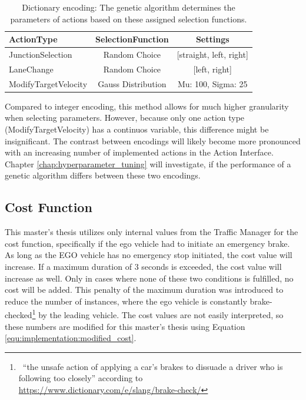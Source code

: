 \begin{table}[ht]
	\centering
	\begin{tabular}{lcc}
		\hline
		ActionType & SelectionFunction & Settings \\
		\hline
		JunctionSelection 	& Random Choice & [straight, left, right] \\
		LaneChange 			& Random Choice & [left, right]\\
		ModifyTargetVelocity & Gauss Distribution & Mu: 100, Sigma: 25\\
		\hline
	\end{tabular}
	\caption{Dictionary encoding: The genetic algorithm determines the parameters of actions based on these assigned selection functions.}
	\label{tab:implementation:dict_encoding_probabilities}
\end{table}

Compared to integer encoding, this method allows for much higher granularity when selecting parameters. However, because only one action type (ModifyTargetVelocity) has a continuos variable, this difference might be insignificant. The contrast between encodings will likely become more pronounced with an increasing number of implemented actions in the Action Interface. Chapter \ref{chap:hyperparameter_tuning} will investigate, if the performance of a genetic algorithm differs between these two encodings.

\subsection{Cost Function}
\label{sect:implementation:cost_function}
This master's thesis utilizes only internal values from the Traffic Manager for the cost function, specifically if the ego vehicle had to initiate an emergency brake. As long as the EGO vehicle has no emergency stop initiated, the cost value will increase. If a maximum duration of 3 seconds is exceeded, the cost value will increase as well. Only in cases where none of these two conditions is fulfilled, no cost will be added. This penalty of the maximum duration was introduced to reduce the number of instances, where the ego vehicle is constantly brake-checked\footnote{~\enquote{the unsafe action of applying a car’s brakes to dissuade a driver who is following too closely} according to \href{https://www.dictionary.com/e/slang/brake-check/}{https://www.dictionary.com/e/slang/brake-check/}} by the leading vehicle. The cost values are not easily interpreted, so these numbers are modified for this master's thesis using Equation \ref{equ:implementation:modified_cost}.

